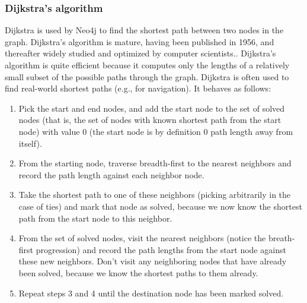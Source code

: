 \subsubsection{Dijkstra's algorithm}
Dijkstra  is used  by Neo4j to find the shortest path between two nodes in the graph. Dijkstra’s algorithm is mature, having been published in 1956, and thereafter widely studied and optimized by computer scientists.\citep{neo13}. Dijkstra’s algorithm is quite efficient because it computes only the lengths of a relatively small subset of the possible paths through the graph. Dijkstra is often used to find real-world shortest paths (e.g., for navigation). It behaves as follows:
\begin{enumerate}
\item Pick the start and end nodes, and add the start node to the set of solved nodes (that is, the set of nodes with known shortest path from the start node) with value 0 (the start node is by definition 0 path length away from itself).
\item From the starting node, traverse breadth-first to the nearest neighbors and record the path length against each neighbor node.
\item Take the shortest path to one of these neighbors (picking arbitrarily in the case of ties) and mark that node as solved, because we now know the shortest path from the start node to this neighbor.
\item From the set of solved nodes, visit the nearest neighbors (notice the breath-first progression) and record the path lengths from the start node against these new neighbors. Don’t visit any neighboring nodes that have already been solved, because we know the shortest paths to them already.
\item Repeat steps 3 and 4 until the destination node has been marked solved.
\end{enumerate}



